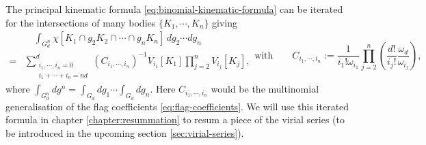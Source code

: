 The principal kinematic formula \eqref{eq:binomial-kinematic-formula} can be iterated for the intersections of many bodies $\{K_1, \cdots, K_n\}$ giving \cite{Santalo2004,MarechalPRE2014}
\begin{subequations}\label{eq:multinomial-kinematic-formula}
  \begin{equation}
    \begin{split}
      & \quad
      \int_{G_d^n} \chi[K_1 \cap g_2 K_2 \cap \cdots \cap g_n K_n]
      \, dg_2 \cdots dg_n
      \\ = &
      \sum_{\substack{i_1, \cdots, i_n = 0 \\ i_1 + \cdots + i_n = nd}}^d
      (C_{i_1, \cdots, i_n})^{-1}
      V_{i_1}[K_1]
      \prod_{j=2}^n
      V_{i_j}[K_j],
    \end{split}
  \end{equation}
  \begin{equation}
    \textrm{with} \qquad
    C_{i_1, \cdots, i_n}
    := \frac{1}{i_1! \omega_{i_1}}
    \prod_{j=2}^n
    \left(
    \frac{d!}{i_j!} \frac{\omega_d}{\omega_{i_j}}
    \right),
  \end{equation}
\end{subequations}
where $\int_{G_d^n} dg^n = \int_{G_d} dg_1 \cdots \int_{G_d} dg_n$.
Here $C_{i_1, \cdots, i_n}$ would be the multinomial generalisation of the flag coefficients \eqref{eq:flag-coefficients}.
We will use this iterated formula in chapter \ref{chapter:resummation} to resum a piece of the virial series (to be introduced in the upcoming section \ref{sec:virial-series}).


